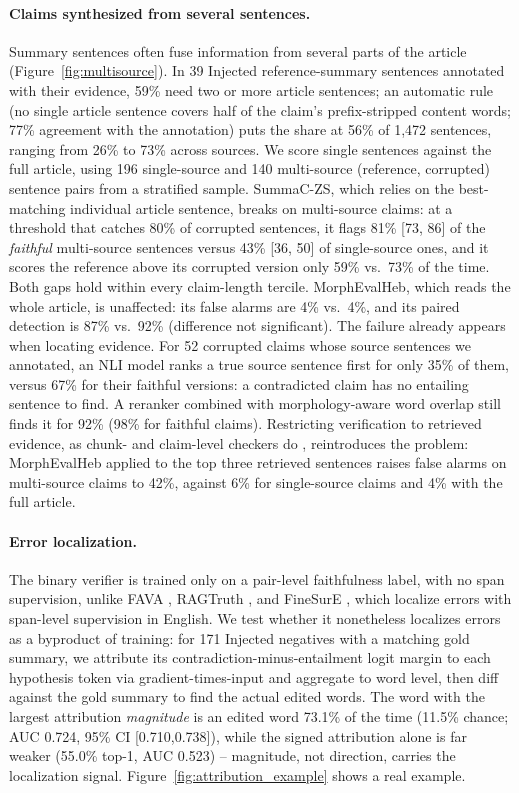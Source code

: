 \documentclass[11pt]{article}
\begin{document}
\paragraph{Claims synthesized from several sentences.} Summary sentences often fuse information from several parts of the article (Figure~\ref{fig:multisource}). In 39 Injected reference-summary sentences annotated with their evidence, 59\% need two or more article sentences; an automatic rule (no single article sentence covers half of the claim's prefix-stripped content words; 77\% agreement with the annotation) puts the share at 56\% of 1,472 sentences, ranging from 26\% to 73\% across sources. We score single sentences against the full article, using 196 single-source and 140 multi-source (reference, corrupted) sentence pairs from a stratified sample. SummaC-ZS, which relies on the best-matching individual article sentence, breaks on multi-source claims: at a threshold that catches 80\% of corrupted sentences, it flags 81\% [73, 86] of the \emph{faithful} multi-source sentences versus 43\% [36, 50] of single-source ones, and it scores the reference above its corrupted version only 59\% vs.\ 73\% of the time. Both gaps hold within every claim-length tercile. MorphEvalHeb, which reads the whole article, is unaffected: its false alarms are 4\% vs.\ 4\%, and its paired detection is 87\% vs.\ 92\% (difference not significant). The failure already appears when locating evidence. For 52 corrupted claims whose source sentences we annotated, an NLI model ranks a true source sentence first for only 35\% of them, versus 67\% for their faithful versions: a contradicted claim has no entailing sentence to find. A reranker combined with morphology-aware word overlap still finds it for 92\% (98\% for faithful claims). Restricting verification to retrieved evidence, as chunk- and claim-level checkers do \citep{zha-etal-2023-alignscore,tang-etal-2024-minicheck}, reintroduces the problem: MorphEvalHeb applied to the top three retrieved sentences raises false alarms on multi-source claims to 42\%, against 6\% for single-source claims and 4\% with the full article.

\paragraph{Error localization.} The binary verifier is trained only on a pair-level faithfulness label, with no span supervision, unlike FAVA \citep{mishra2024fava}, RAGTruth \citep{niu-etal-2024-ragtruth}, and FineSurE \citep{song-etal-2024-finesure}, which localize errors with span-level supervision in English. We test whether it nonetheless localizes errors as a byproduct of training: for 171 Injected negatives with a matching gold summary, we attribute its contradiction-minus-entailment logit margin to each hypothesis token via gradient-times-input and aggregate to word level, then diff against the gold summary to find the actual edited words. The word with the largest attribution \emph{magnitude} is an edited word 73.1\% of the time (11.5\% chance; AUC 0.724, 95\% CI [0.710,0.738]), while the signed attribution alone is far weaker (55.0\% top-1, AUC 0.523) -- magnitude, not direction, carries the localization signal. Figure~\ref{fig:attribution_example} shows a real example.
\end{document}
